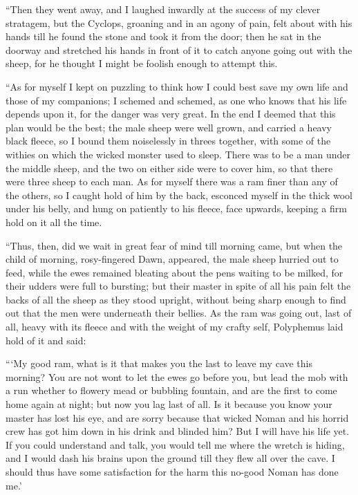 “Then they went away, and I laughed inwardly at the success of my clever
stratagem, but the Cyclops, groaning and in an agony of pain, felt about with
his hands till he found the stone and took it from the door; then he sat in the
doorway and stretched his hands in front of it to catch anyone going out with
the sheep, for he thought I might be foolish enough to attempt this.

“As for myself I kept on puzzling to think how I could best save my own life
and those of my companions; I schemed and schemed, as one who knows that his
life depends upon it, for the danger was very great. In the end I deemed that
this plan would be the best; the male sheep were well grown, and carried a
heavy black fleece, so I bound them noiselessly in threes together, with some
of the withies on which the wicked monster used to sleep. There was to be a man
under the middle sheep, and the two on either side were to cover him, so that
there were three sheep to each man. As for myself there was a ram finer than
any of the others, so I caught hold of him by the back, esconced myself in the
thick wool under his belly, and hung on patiently to his fleece, face upwards,
keeping a firm hold on it all the time.

“Thus, then, did we wait in great fear of mind till morning came, but when the
child of morning, rosy-fingered Dawn, appeared, the male sheep hurried out to
feed, while the ewes remained bleating about the pens waiting to be milked, for
their udders were full to bursting; but their master in spite of all his pain
felt the backs of all the sheep as they stood upright, without being sharp
enough to find out that the men were underneath their bellies. As the ram was
going out, last of all, heavy with its fleece and with the weight of my crafty
self, Polyphemus laid hold of it and said:

“‘My good ram, what is it that makes you the last to leave my cave this
morning? You are not wont to let the ewes go before you, but lead the mob with
a run whether to flowery mead or bubbling fountain, and are the first to come
home again at night; but now you lag last of all. Is it because you know your
master has lost his eye, and are sorry because that wicked Noman and his horrid
crew has got him down in his drink and blinded him? But I will have his life
yet. If you could understand and talk, you would tell me where the wretch is
hiding, and I would dash his brains upon the ground till they flew all over the
cave. I should thus have some satisfaction for the harm this no-good Noman has
done me.’

